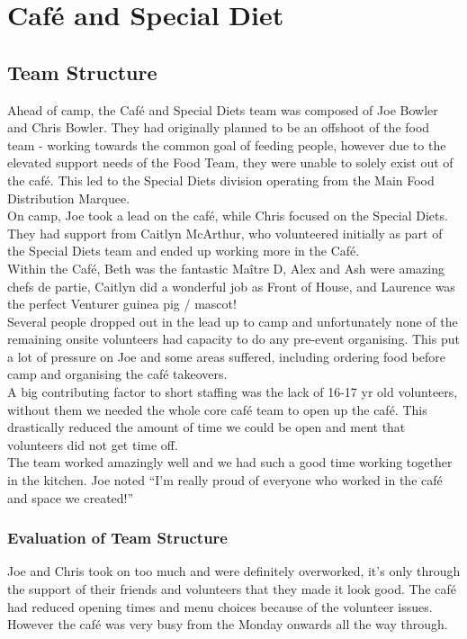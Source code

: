 \chapter{Café and Special Diet}
\section{Team Structure}
Ahead of camp, the Café and Special Diets team was composed of Joe Bowler and Chris Bowler. They had originally planned to be an offshoot of the food team - working towards the common goal of feeding people, however due to the elevated support needs of the Food Team, they were unable to solely exist out of the café. This led to the Special Diets division operating from the Main Food Distribution Marquee. \\

On camp, Joe took a lead on the café, while Chris focused on the Special Diets. They had support from Caitlyn McArthur, who volunteered initially as part of the Special Diets team and ended up working more in the Café.\\

Within the Café, Beth was the fantastic Maître D, Alex and Ash were amazing chefs de partie, Caitlyn did a wonderful job as Front of House, and Laurence was the perfect Venturer guinea pig / mascot!\\

Several people dropped out in the lead up to camp and unfortunately none of the remaining onsite volunteers had capacity to do any pre-event organising. This put a lot of pressure on Joe and some areas suffered, including ordering food before camp and organising the café takeovers.\\

A big contributing factor to short staffing was the lack of 16-17 yr old volunteers, without them we needed the whole core café team to open up the café. This drastically reduced the amount of time we could be open and ment that volunteers did not get time off. \\

The team worked amazingly well and we had such a good time working together in the kitchen. Joe noted ``I'm really proud of everyone who worked in the café and space we created!''
\subsection{Evaluation of Team Structure}
Joe and Chris took on too much and were definitely overworked, it's only through the support of their friends and volunteers that they made it look good. 
The café had reduced opening times and menu choices because of the volunteer issues. However the café was very busy from the Monday onwards all the way through.\\

